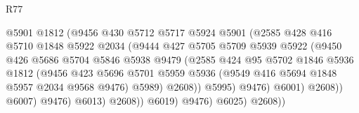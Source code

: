 \begin{lexlean}{R77}
\begin{coremodule}
                                    @5901
                                    @1812
                                    (@9456
                                      @430
                                      @5712
                                      @5717
                                      @5924
                                      @5901
                                      (@2585
                                        @428
                                        @416
                                        @5710
                                        @1848
                                        @5922
                                        @2034
                                        (@9444
                                          @427
                                          @5705
                                          @5709
                                          @5939
                                          @5922
                                          (@9450
                                            @426
                                            @5686
                                            @5704
                                            @5846
                                            @5938
                                            @9479
                                            (@2585
                                              @424
                                              @95
                                              @5702
                                              @1846
                                              @5936
                                              @1812
                                              (@9456
                                                @423
                                                @5696
                                                @5701
                                                @5959
                                                @5936
                                                (@9549 @416 @5694 @1848 @5957 @2034 @9568 @9476)
                                                @5989)
                                              @2608))
                                          @5995)
                                        @9476)
                                      @6001)
                                    @2608))
                                @6007)
                              @9476)
                            @6013)
                          @2608))
                      @6019)
                    @9476)
                  @6025)
                @2608))

\end{coremodule}
\end{lexlean}
